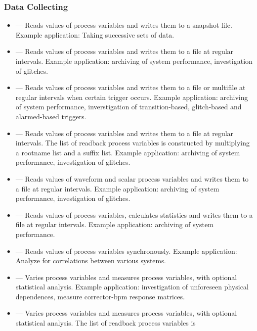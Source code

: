 \documentclass[11pt]{article}
\begin{document}
\subsubsection{Data Collecting}
\begin{itemize}
\item {} --- Reads values of process variables and writes them to a snapshot file. 
        Example application: Taking successive sets of data.
\item {} --- Reads values of process variables and writes them to a file at regular intervals.
        Example application: archiving of system performance, investigation of glitches.
\item {} --- Reads values of process variables and writes them to a file or multifile at regular intervals when certain trigger occurs. 
        Example application: archiving of system performance, inverstigation of 
        transition-based, glitch-based and alarmed-based triggers. 
\item {} --- Reads values of process variables
        and writes them to a file at regular intervals. The list of readback process
        variables is constructed by multiplying a rootname list and a suffix list.
        Example application: archiving of system performance, investigation of
        glitches.
\item {} --- Reads values of waveform and scalar process variables and writes them to a file at regular intervals.
        Example application: archiving of system performance, investigation of glitches.
\item {} --- Reads values of process variables, calculates statistics and writes them to a file at regular intervals.
        Example application: archiving of system performance.
\item {} --- Reads values of process variables
        synchronously.  Example application: Analyze for correlations
        between various systems.
\item {} --- Varies process variables and measures process variables, 
        with optional statistical analysis.
        Example application:  investigation of unforeseen physical dependences,
        measure corrector-bpm response matrices.
\item {} --- Varies process variables and measures process variables, 
        with optional statistical analysis. The list of readback process variables is

\end{itemize}
\end{document}
